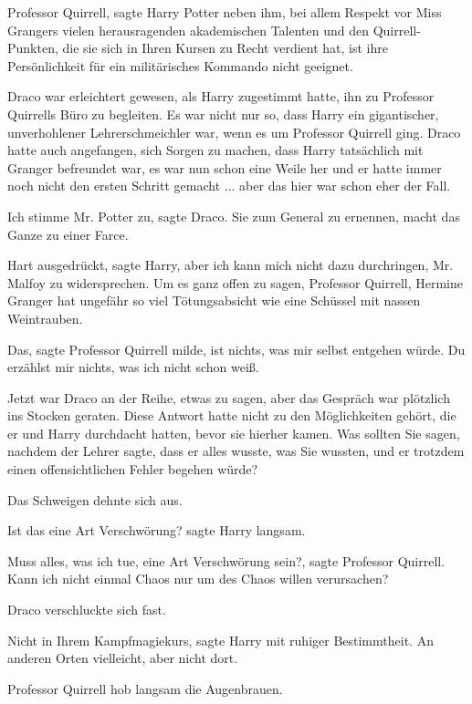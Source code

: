 \glqq{}Professor Quirrell\grqq{}, sagte Harry Potter neben ihm, \glqq{}bei allem
Respekt vor Miss Grangers vielen herausragenden akademischen Talenten und den
Quirrell-Punkten, die sie sich in Ihren Kursen zu Recht verdient hat, ist ihre
Persönlichkeit für ein militärisches Kommando nicht geeignet.\grqq{}

Draco war erleichtert gewesen, als Harry zugestimmt hatte, ihn zu Professor
Quirrells Büro zu begleiten. Es war nicht nur so, dass Harry ein gigantischer,
unverhohlener Lehrerschmeichler war, wenn es um Professor Quirrell ging. Draco
hatte auch angefangen, sich Sorgen zu machen, dass Harry tatsächlich mit Granger
befreundet war, es war nun schon eine Weile her und er hatte immer noch nicht
den ersten Schritt gemacht ... aber das hier war schon eher der Fall.

\glqq{}Ich stimme Mr. Potter zu\grqq{}, sagte Draco. \glqq{}Sie zum General zu
ernennen, macht das Ganze zu einer Farce.\grqq{}

\glqq{}Hart ausgedrückt\grqq{}, sagte Harry, \glqq{}aber ich kann mich nicht
dazu durchringen, Mr. Malfoy zu widersprechen. Um es ganz offen zu sagen,
Professor Quirrell, Hermine Granger hat ungefähr so viel Tötungsabsicht wie eine
Schüssel mit nassen Weintrauben.\grqq{}

\glqq{}Das\grqq{}, sagte Professor Quirrell milde, \glqq{}ist nichts, was mir
selbst entgehen würde. Du erzählst mir nichts, was ich nicht schon weiß.\grqq{}

Jetzt war Draco an der Reihe, etwas zu sagen, aber das Gespräch war plötzlich
ins Stocken geraten. Diese Antwort hatte nicht zu den Möglichkeiten gehört, die
er und Harry durchdacht hatten, bevor sie hierher kamen. Was sollten Sie sagen,
nachdem der Lehrer sagte, dass er alles wusste, was Sie wussten, und er trotzdem
einen offensichtlichen Fehler begehen würde?

Das Schweigen dehnte sich aus.

\glqq{}Ist das eine Art Verschwörung?\grqq{} sagte Harry langsam.

\glqq{}Muss alles, was ich tue, eine Art Verschwörung sein?\grqq{}, sagte
Professor Quirrell. \glqq{}Kann ich nicht einmal Chaos nur um des Chaos willen
verursachen?\grqq{}

Draco verschluckte sich fast.

\glqq{}Nicht in Ihrem Kampfmagiekurs\grqq{}, sagte Harry mit ruhiger
Bestimmtheit. \glqq{}An anderen Orten vielleicht, aber nicht dort.\grqq{}

Professor Quirrell hob langsam die Augenbrauen.

